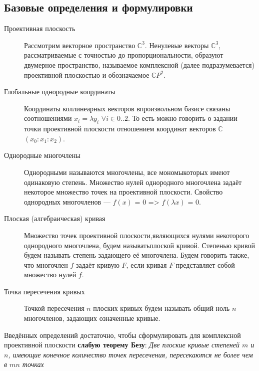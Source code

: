 \documentclass[a4paper, 12pt]{article}
\begin{document}
\subsection{Базовые определения и формулировки}
\begin{description}
\item[Проективная плоскость]
Рассмотрим векторное пространство $\mathbb{C}^3$. Ненулевые векторы $\mathbb{C}^3$, рассматриваемые с точностью до пропорциональности, образуют двумерное пространство, называемое комплексной (далее подразумевается) проективной плоскостью и обозначаемое $\mathbb{C}P^2$.
\item[Глобальные однородные координаты]
Координаты коллинеарных векторов в\newline произвольном базисе связаны соотношениями $x_i = \lambda y_i$ $\forall i \in {0..2}$. То есть можно говорить о задании точки проективной плоскости отношением координат векторов $\mathbb{C}$ $(x_0:x_1:x_2)$.
\end{description}
\begin{description}
\item[Однородные многочлены] Однородными называются многочлены, все мономы\newline которых имеют одинаковую степень. Множество нулей однородного многочлена задаёт некоторое множество точек на проективной плоскости. Свойство однородных многочленов --- $f(x)$ = $0$ => $f(\lambda x)$ = $0$.
\item[Плоская (алгебраическая) кривая]
Множество точек проективной плоскости,\newline являющихся нулями некоторого однородного многочлена, будем называть\newline плоской кривой. Степенью кривой будем называть степень задающего её многочлена. Будем говорить также, что многочлен $f$ задаёт кривую $F$, если кривая $F$ представляет собой множество нулей $f$.
\item[Точка пересечения кривых]
Точкой пересечения $n$ плоских кривых будем называть общий ноль $n$ многочленов, задающих означенные кривые.
\end{description}
Введённых определений достаточно, чтобы сформулировать для комплексной проективной плоскости \textbf{слабую теорему Безу}:
\textit{Две плоские кривые степеней $m$ и $n$, имеющие конечное количество точек пересечения, пересекаются не более чем в $mn$ точках}
\end{document}
